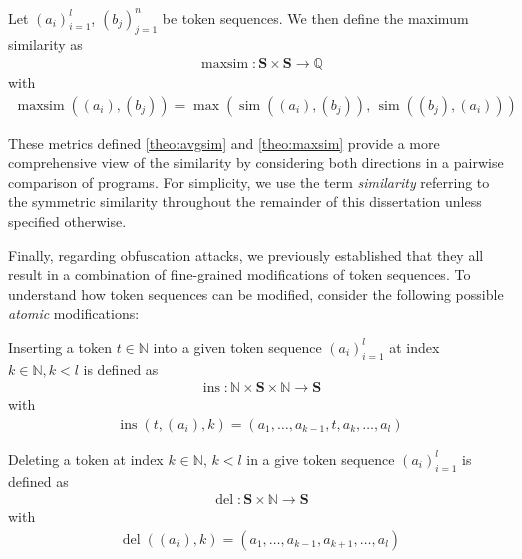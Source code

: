 \begin{theorem} \label{theo:maxsim}
    Let \((a_i)_{i=1}^l\), \((b_j)_{j=1}^n\) be token sequences.
    We then define the maximum similarity as
    \begin{align*}
    \operatorname{maxsim} : \mathbf{S} \times \mathbf{S} \rightarrow \mathbb{Q}
    \end{align*}
    with
    \begin{align*} 
     \operatorname{maxsim}((a_i), (b_j)) = \max(\operatorname{sim}((a_i), (b_j)),\, \operatorname{sim}((b_j), (a_i)))
\end{align*}

\end{theorem}

These metrics defined \autoref{theo:avgsim} and \autoref{theo:maxsim} provide a more comprehensive view of the similarity by considering both directions in a pairwise comparison of programs.
For simplicity, we use the term \textit{similarity} referring to the symmetric similarity throughout the remainder of this dissertation unless specified otherwise.

Finally, regarding obfuscation attacks, we previously established that they all result in a combination of fine-grained modifications of token sequences. To understand how token sequences can be modified, consider the following possible \textit{atomic} modifications:

\begin{theorem}
    Inserting a token \(t \in \mathbb{N}\) into a given token sequence \((a_i)_{i=1}^l\) at index \(k \in \mathbb{N}, k < l\) is defined as
    \begin{align*}
            \operatorname{ins} : \mathbb{N} \times \mathbf{S} \times \mathbb{N} \rightarrow \mathbf{S}
    \end{align*}
    with
    \begin{align*}
        \operatorname{ins}(t, (a_i), k) = (a_1, \dots, a_{k-1}, t, a_k, \dots, a_l)
    \end{align*}
\end{theorem}

\begin{theorem}
     Deleting a token at index \(k \in \mathbb{N},\, k < l\) in a give token sequence \((a_i)_{i=1}^l\) is defined as
    \begin{align*}
            \operatorname{del} : \mathbf{S} \times \mathbb{N} \rightarrow \mathbf{S}
    \end{align*}
    with
    \begin{align*}
        \operatorname{del}((a_i), k) = (a_1, \dots, a_{k-1}, a_{k+1}, \dots, a_l)
    \end{align*}
\end{theorem}

